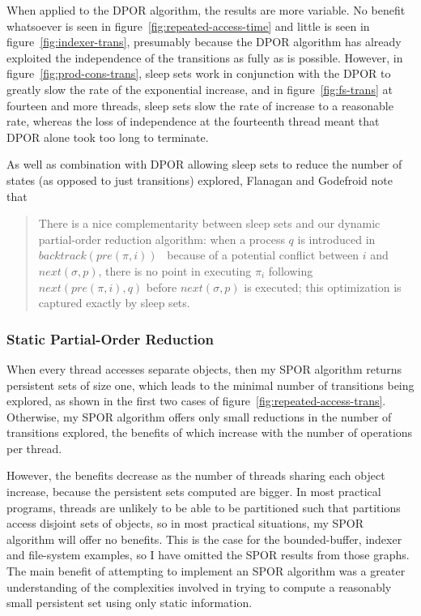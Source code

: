 \documentclass[12pt,a4paper,twoside,openright]{report}
\begin{document}
When applied to the DPOR algorithm, the results
are more variable. No benefit whatsoever is seen
in figure~\ref{fig:repeated-access-time} and little
is seen in figure~\ref{fig:indexer-trans},
presumably because the DPOR algorithm has already
exploited the independence of the transitions
as fully as is possible. However, in
figure~\ref{fig:prod-cons-trans}, sleep sets
work in conjunction with the DPOR to greatly
slow the rate of the exponential increase,
and in figure~\ref{fig:fs-trans} at fourteen and
more threads, sleep
sets slow the rate of increase to a reasonable
rate, whereas the loss of independence at the
fourteenth thread meant that DPOR alone took too long
to terminate.

As well as combination with DPOR allowing
sleep sets to reduce the number of states
(as opposed to just transitions) explored,
Flanagan and Godefroid note that
\begin{quote}
	There is a nice complementarity between sleep sets and our
	dynamic partial-order reduction algorithm: when a process
	$q$ is introduced in $\textit{backtrack}(\textit{pre}(\pi, i))$
	\textellipsis \ because
	of a potential conflict between $i$ and
	$\textit{next}(\sigma, p)$, there
	is no point in executing $\pi_i$ following
	$\textit{next}(\textit{pre}(\pi, i), q)$ before
	$\textit{next}(\sigma, p)$ is executed;
	this optimization is captured exactly
	by sleep sets.
\end{quote}

\subsubsection{Static Partial-Order Reduction}
When every thread accesses separate objects,
then my SPOR algorithm returns persistent sets
of size one, which leads to the minimal number
of transitions being explored, as shown in the
first two cases of
figure~\ref{fig:repeated-access-trans}.
Otherwise, my SPOR algorithm offers only
small reductions in the number of transitions
explored, the benefits of which increase with
the number of operations per thread.

However, the benefits decrease as
the number of threads sharing each object
increase, because the persistent sets
computed are bigger. In most practical
programs, threads are unlikely to be
able to be partitioned such that
partitions access disjoint sets of objects,
so in most practical situations, my SPOR
algorithm will offer no benefits. This is
the case for the bounded-buffer, indexer
and file-system examples, so I have omitted
the SPOR results from those graphs.
The main benefit of attempting to implement
an SPOR algorithm was a greater understanding
of the complexities involved in trying to
compute a reasonably small persistent set
using only static information.
\end{document}
